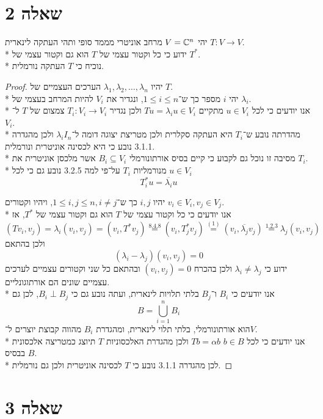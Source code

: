 \section{שאלה 2}
יהי $V = \mathbb{C}^n$ מרחב אוניטרי מממד סופי ותהי העתקה לינארית $T : V \to V$. \\*
ידוע כי כל וקטור עצמי של $T$ הוא גם וקטור עצמי של $T^*$. \\*
נוכיח כי $T$ העתקה נורמלית.
\begin{proof}
	יהיו $\lambda_1, \lambda_2, \hdots, \lambda_n$ הערכים העצמיים של $T$. \\*
	יהי $i$ מספר כך ש־$1 \le i \le n$, ונגדיר את $V_i$ להיות המרחב בעצמי של $\lambda_i$. \\*
	אנו יודעים כי לכל $u \in V_i$ מתקיים $T u = \lambda_i u \in V_i$ ולכן נגדיר $T_i : V_i \to V_i$ צמצום של $T$ ל־$V_i$. \\*
	מהדרתה נובע ש־$T_i$ היא העתקה סקלרית ולכן מטריצת יצוגה דומה ל־$\lambda_i I_n$ ולכן מהגדרה 3.1.1 נובע כי היא לכסינה אוניטרית ונורמלית. \\*
	מסיבה זו נוכל גם לקבוע כי קיים בסיס אורתונורמלי $B_i \subseteq V_i$ אשר מלכסן אוניטרית את $T_i$. \\*
	מנורמליות $T_i$ על־פי למה 3.2.5 נובע גם כי לכל $u \in V_i$
	\[
		T_i^* u = \overline{\lambda_i} u \tag{1}
	\]

	יהיו $i, j$ כך ש־$1 \le i, j \le n, i \ne j$, ויהיו וקטורים $v_i \in V_i, v_j \in V_j$. \\*
	אנו יודעים כי כל וקטור עצמי של $T$ הוא גם וקטור עצמי של $T^*$, אז
	\[
		(T v_i, v_j)
		= \lambda_i (v_i, v_j) = (v_i, T^* v_j)
		\overset{\text{8.4.8}}{=} (v_i, T_j^* v_j)
		\overset{(1)}{=} (v_i, \overline{\lambda_j} v_j)
		\overset{\text{1.2.3}}{=} \lambda_j (v_i, v_j)
	\]
	ולכן בהתאם
	\[
		(\lambda_i - \lambda_j) (v_i, v_j) = 0
	\]
	ידוע כי $\lambda_i \ne \lambda_j$ ולכן בהכרח $(v_i, v_j) = 0$ ובהתאם כל שני וקטורים עצמיים לערכים עצמיים שונים הם אורתוגונליים. \\*
	אנו יודעים כי $B_i$ ו־$B_j$ בלתי תלויות לינארית, ועתה נובע גם כי $B_i \perp B_j$, לכן גם
	\[
		B = \bigcup_{i = 1}^n B_i
	\]
	הוא אורתונורמלי, בלתי תלוי לינארית, ומהגדרת $B_i$ מהווה קבוצת יוצרים ל־$V$. \\*
	אנו יודעים כי לכל $b \in B$ $T b = \alpha b$ ולכן מהגדרת האלכסוניות $T$ תיוצג כמטריצה אלכסונית בבסיס $B$. \\*
	לכן מהגדרה 3.1.1 נובע כי $T$ לכסינה אוניטרית ולכן גם נורמלית.
\end{proof}

\section{שאלה 3}
